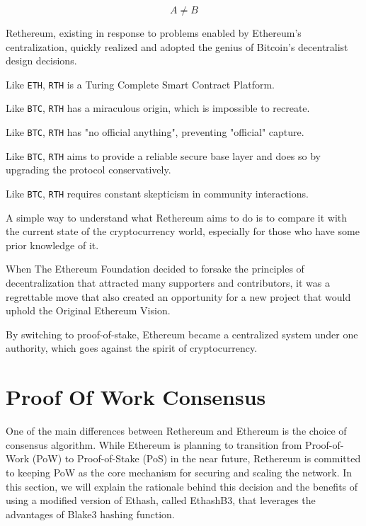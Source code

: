 \documentclass[a4paper,onecolumn, superscriptaddress,10pt,accepted=2020-05-01,issue=1, volume=2, shorttitle=papers]{compositionalityarticle}
\begin{document}
\begin{equation}
  A \neq B
\end{equation}

    Rethereum, existing in response to problems enabled by Ethereum's centralization, quickly realized and adopted the genius of Bitcoin's decentralist design decisions.

\vspace{0.5cm}
    
    Like \texttt{ETH}, \texttt{RTH} is a Turing Complete Smart Contract Platform.
    
    Like \texttt{BTC}, \texttt{RTH} has a miraculous origin, which is impossible to recreate.
    
    Like \texttt{BTC}, \texttt{RTH} has "no official anything", preventing "official" capture.
    
    Like \texttt{BTC}, \texttt{RTH} aims to provide a reliable secure base layer and does so by upgrading the protocol conservatively.
    
    Like \texttt{BTC}, \texttt{RTH} requires constant skepticism in community interactions.
    
\vspace{1cm}

    A simple way to understand what Rethereum aims to do is to compare it with the current state of the cryptocurrency world, especially for those who have some prior knowledge of it.

When The Ethereum Foundation decided to forsake the principles of decentralization that attracted many supporters and contributors, it was a regrettable move that also created an opportunity for a new project that would uphold the Original Ethereum Vision.

By switching to proof-of-stake, Ethereum became a centralized system under one authority, which goes against the spirit of cryptocurrency.

\section{Proof Of Work Consensus}
One of the main differences between Rethereum and Ethereum is the choice of consensus algorithm. While Ethereum is planning to transition from Proof-of-Work (PoW) to Proof-of-Stake (PoS) in the near future, Rethereum is committed to keeping PoW as the core mechanism for securing and scaling the network. In this section, we will explain the rationale behind this decision and the benefits of using a modified version of Ethash, called EthashB3, that leverages the advantages of Blake3 hashing function.
\end{document}
